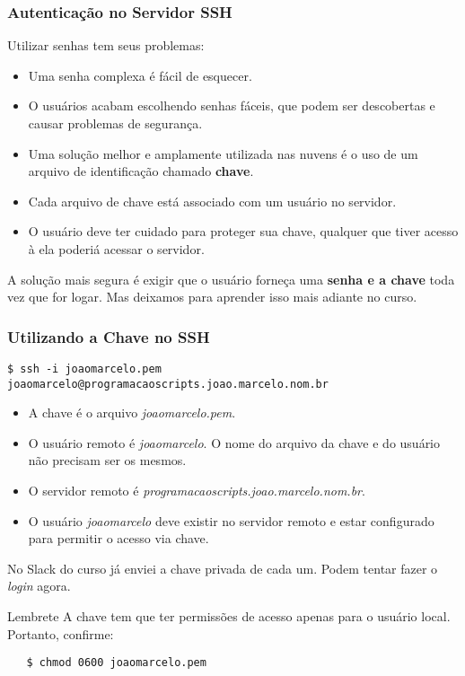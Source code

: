\documentclass{beamer}
\begin{document}
\begin{frame}
   \frametitle{Autenticação no Servidor SSH}
   Utilizar senhas tem seus problemas:
   \begin{itemize}
      \item Uma senha complexa é fácil de esquecer.
      \item O usuários acabam escolhendo senhas fáceis, que podem ser descobertas e causar problemas de segurança.
      \item Uma solução melhor e amplamente utilizada nas nuvens é o uso de um arquivo de identificação chamado \textbf{chave}.
      \item Cada arquivo de chave está associado com um usuário no servidor.
      \item O usuário deve ter cuidado para proteger sua chave, qualquer que tiver acesso à ela poderiá acessar o servidor.
   \end{itemize}
   A solução mais segura é exigir que o usuário forneça uma \textbf{senha e a chave} toda vez que for logar. Mas deixamos para aprender isso mais adiante no curso.
\end{frame}

\begin{frame}[fragile]
   \frametitle{Utilizando a Chave no SSH}
   \scriptsize
   \begin{verbatim}
$ ssh -i joaomarcelo.pem joaomarcelo@programacaoscripts.joao.marcelo.nom.br   
   \end{verbatim}
   \normalsize
   \begin{itemize}
      \item A chave é o arquivo \textit{joaomarcelo.pem}.
      \item O usuário remoto é \textit{joaomarcelo}. O nome do arquivo da chave e do usuário não precisam ser os mesmos.
      \item O servidor remoto é \textit{programacaoscripts.joao.marcelo.nom.br}.
      \item O usuário \textit{joaomarcelo} deve existir no servidor remoto e estar configurado para permitir o acesso via chave.
   \end{itemize}
   No Slack do curso já enviei a chave privada de cada um. Podem tentar fazer o \textit{login} agora.
   \begin{block}{Lembrete}
   A chave tem que ter permissões de acesso apenas para o usuário local. Portanto, confirme:
   \begin{verbatim}
   $ chmod 0600 joaomarcelo.pem
   \end{verbatim}
   \end{block}
\end{frame}
\end{document}
